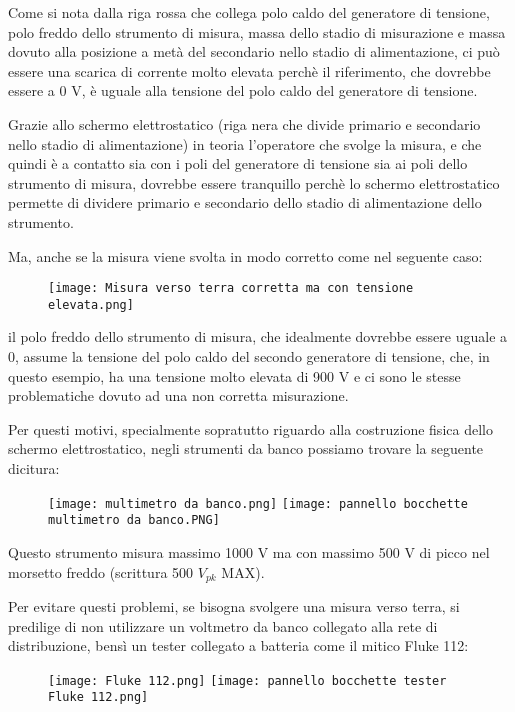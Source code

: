 Come si nota dalla riga rossa che collega polo caldo del generatore di tensione, polo freddo dello strumento di misura, 
massa dello stadio di misurazione e massa dovuto alla posizione a metà del secondario nello stadio di alimentazione, 
ci può essere una scarica di corrente molto elevata perchè il riferimento, che dovrebbe essere a 0 V, è uguale alla tensione del polo caldo del generatore di tensione. \newline 

Grazie allo schermo elettrostatico (riga nera che divide primario e secondario nello stadio di alimentazione) in teoria l'operatore che svolge la misura, e che quindi è a contatto sia con i poli del generatore di tensione sia ai poli dello strumento di misura, 
dovrebbe essere tranquillo perchè lo schermo elettrostatico permette di dividere primario e secondario dello stadio di alimentazione dello strumento. \newline 

Ma, anche se la misura viene svolta in modo corretto come nel seguente caso: 

\begin{figure}[h]
    \centering
    \texttt{[image: Misura verso terra corretta ma con tensione elevata.png]}
\end{figure}


il polo freddo dello strumento di misura, che idealmente dovrebbe essere uguale a 0, assume la tensione del polo caldo del secondo generatore di tensione, 
che, in questo esempio, ha una tensione molto elevata di 900 V e ci sono le stesse problematiche dovuto ad una non corretta misurazione. \newline 

\newpage 

Per questi motivi, specialmente sopratutto riguardo alla costruzione fisica dello schermo elettrostatico, 
negli strumenti da banco possiamo trovare la seguente dicitura: 

\begin{figure}[h]
    \centering
    \texttt{[image: multimetro da banco.png]}
    \texttt{[image: pannello bocchette multimetro da banco.PNG]}
\end{figure}

Questo strumento misura massimo 1000 V ma con massimo 500 V di picco nel morsetto freddo 
(scrittura 500 $V_{pk}$ MAX). \newline 

Per evitare questi problemi, se bisogna svolgere una misura verso terra, si predilige di non utilizzare un voltmetro da banco collegato alla rete di distribuzione, 
bensì un tester collegato a batteria come il mitico Fluke 112: 

\begin{figure}[h]
    \centering
    \texttt{[image: Fluke 112.png]}
    \texttt{[image: pannello bocchette tester Fluke 112.png]}
\end{figure}

\newpage 